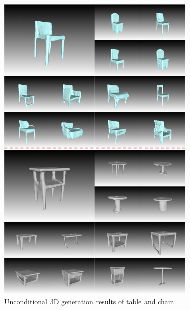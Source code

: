 \documentclass[11pt]{article}
\newcommand\1{\mathds{1}}
\begin{document}
\begin{figure}[htbp]
    \centering
    \includegraphics[width=0.85\textwidth]{imgs/table_chair.pdf}
    \caption{Unconditional 3D generation results of table and chair. }
    \label{fig:chairs_table_unconditional} 
\end{figure}
\end{document}
